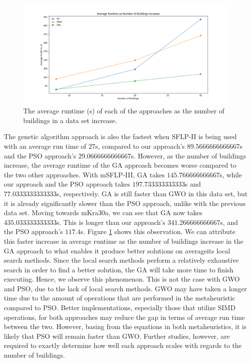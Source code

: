 \begin{figure}[h!]
\centering
\begin{adjustwidth}{-0.45in}{}
\includegraphics[scale=0.5]{./images/chap07-rd/approaches-average-runtime-over-no-of-buildings.png}
\end{adjustwidth}
\caption{The average runtime (s) of each of the approaches as the number of buildings in a data set increase.}
\label{graph-approaches-runtime-no-buildings}
\end{figure}

The genetic algorithm approach is also the fastest when SFLP-II is being used with an average run time of $27$s, compared to our approach's $89.5666666666667$s and the PSO approach's $29.0666666666667$s. However, as the number of buildings increase, the average runtime of the GA approach becomes worse compared to the two other approaches. With mSFLP-III, GA takes $145.766666666667$s, while our approach and the PSO approach takes $197.733333333333$s and $77.0333333333333$s, respectively. GA is still faster than GWO in this data set, but it is already significantly slower than the PSO approach, unlike with the previous data set. Moving towards mKra30a, we can see that GA now takes $435.033333333333$s. This is longer than our approach's $341.266666666667$s, and the PSO approach's $117.4$s. Figure \ref{graph-approaches-runtime-no-buildings} shows this observation. We can attribute this faster increase in average runtime as the number of buildings increase in the GA approach to what enables it produce better solutions on average\textemdash its local search methods. Since the local search methods perform a relatively exhaustive search in order to find a better solution, the GA will take more time to finish executing. Hence, we observe this phenomenon. This is not the case with GWO and PSO, due to the lack of local search methods. GWO may have taken a longer time due to the amount of operations that are performed in the metaheuristic compared to PSO. Better implementations, especially those that utilize SIMD operations, for both approaches may reduce the gap in terms of average run time between the two. However, basing from the equations in both metaheuristics, it is likely that PSO will remain faster than GWO. Further studies, however, are required to exactly determine how well each approach scales with regards to the number of buildings.

